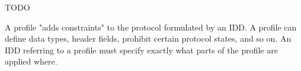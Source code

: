 %
%

TODO

A profile "adds constraints" to the protocol formulated by an IDD.
A profile can define data types, header fields, prohibit certain protocol states, and so on.
An IDD referring to a profile must specify exactly what parts of the profile are applied where.